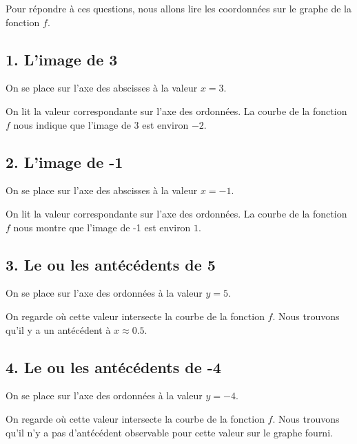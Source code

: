 \documentclass[answers]{exam}
\begin{document}
\begin{solution}
Pour répondre à ces questions, nous allons lire les coordonnées sur le graphe de la fonction $f$. 

\subsection*{1. L'image de 3}

\begin{compactitem}
\item On se place sur l'axe des abscisses à la valeur $x = 3$.
\item On lit la valeur correspondante sur l'axe des ordonnées. La courbe de la fonction $f$ nous indique que l'image de 3 est environ \(-2\).
\end{compactitem}

\subsection*{2. L'image de -1}

\begin{compactitem}
\item On se place sur l'axe des abscisses à la valeur $x = -1$.
\item On lit la valeur correspondante sur l'axe des ordonnées. La courbe de la fonction $f$ nous montre que l'image de -1 est environ \(1\).
\end{compactitem}

\subsection*{3. Le ou les antécédents de 5}

\begin{compactitem}
\item On se place sur l'axe des ordonnées à la valeur $y = 5$.
\item On regarde où cette valeur intersecte la courbe de la fonction $f$. Nous trouvons qu'il y a un antécédent à \(x \approx 0.5\).
\end{compactitem}

\subsection*{4. Le ou les antécédents de -4}

\begin{compactitem}
\item On se place sur l'axe des ordonnées à la valeur $y = -4$.
\item On regarde où cette valeur intersecte la courbe de la fonction $f$. Nous trouvons qu'il n'y a pas d'antécédent observable pour cette valeur sur le graphe fourni.
\end{compactitem}


\end{solution}
\end{document}
